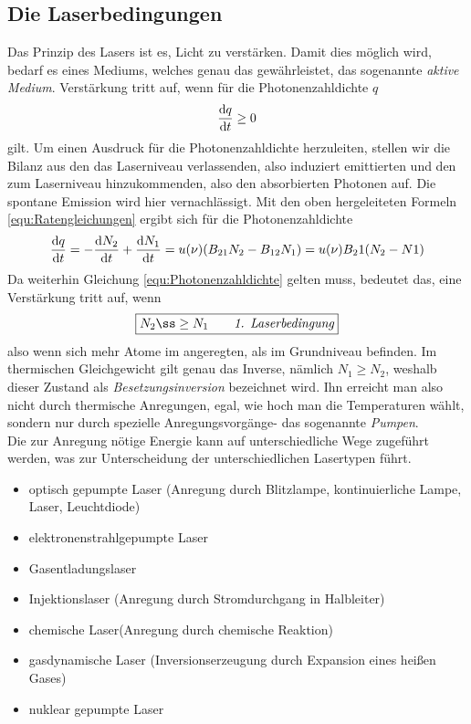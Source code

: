 \documentclass[a4paper,twoside,final]{article}
\begin{document}
\subsection{Die Laserbedingungen}
Das Prinzip des Lasers ist es, Licht zu verstärken. Damit dies möglich wird, bedarf es eines Mediums, welches genau das gewährleistet, das sogenannte \textit{aktive Medium}. Verstärkung tritt auf, wenn für die Photonenzahldichte $q$
\begin{align}
  \dv{q}{t} \geq 0
  \label{equ:Photonenzahldichte}
\end{align}
gilt. Um einen Ausdruck für die Photonenzahldichte herzuleiten, stellen wir die Bilanz aus den das Laserniveau verlassenden, also induziert emittierten und den zum Laserniveau hinzukommenden, also den absorbierten Photonen auf. Die spontane Emission wird hier vernachlässigt. Mit den oben hergeleiteten Formeln \eqref{equ:Ratengleichungen} ergibt sich für die Photonenzahldichte
\begin{align}
    \dv{q}{t}=-\dv{N_2}{t}+\dv{N_1}{t}=u(\nu)(B_{21}N_2-B_{12}N_1)=u(\nu)B_21(N_2-N1)
\end{align}
Da weiterhin Gleichung \eqref{equ:Photonenzahldichte} gelten muss, bedeutet das, eine Verstärkung tritt auf, wenn
\begin{align}
  \boxed{N_2 ß\geq N_1 \qquad \emph{1. Laserbedingung}}
\end{align}
also wenn sich mehr Atome im angeregten, als im Grundniveau befinden. Im thermischen Gleichgewicht gilt genau das Inverse, nämlich $N_1 \geq N_2$, weshalb dieser Zustand als \textit{Besetzungsinversion} bezeichnet wird. Ihn erreicht man also nicht durch thermische Anregungen, egal, wie hoch man die Temperaturen wählt, sondern nur durch spezielle Anregungsvorgänge- das sogenannte \textit{Pumpen}.\\
Die zur Anregung nötige Energie kann auf unterschiedliche Wege zugeführt werden, was zur Unterscheidung der unterschiedlichen Lasertypen führt.
\begin{itemize}
  \item optisch gepumpte Laser (Anregung durch Blitzlampe, kontinuierliche Lampe, Laser, Leuchtdiode)
  \item elektronenstrahlgepumpte Laser
  \item Gasentladungslaser
  \item Injektionslaser (Anregung durch Stromdurchgang in Halbleiter)
  \item chemische Laser(Anregung durch chemische Reaktion)
  \item gasdynamische Laser (Inversionserzeugung durch Expansion eines heißen Gases)
  \item nuklear gepumpte Laser
\end{itemize}
\end{document}
